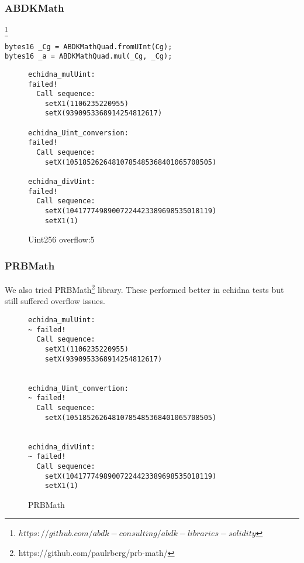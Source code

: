 \documentclass[runningheads]{llncs}
\begin{document}
\subsubsection{ABDKMath}
\footnote{$https://github.com/abdk-consulting/abdk-libraries-solidity$} 
\begin{verbatim}
bytes16 _Cg = ABDKMathQuad.fromUInt(Cg);
bytes16 _a = ABDKMathQuad.mul(_Cg, _Cg);
\end{verbatim}



\label{Uint256 overflow:5}
\begin{figure}
    \centering
    \caption{Uint256 overflow:5}
    \label{fig:Echidna Uint56 Overflow Tests}
\begin{lstlisting}[style=Bash]
echidna_mulUint:  
failed!
  Call sequence:
    setX1(1106235220955)
    setX(9390953368914254812617)

echidna_Uint_conversion: 
failed!
  Call sequence:
    setX(10518526264810785485368401065708505)

echidna_divUint:  
failed!
  Call sequence:
    setX(10417774989007224423389698535018119)
    setX1(1)
\end{lstlisting}
\end{figure}

\newpage 
\subsubsection{PRBMath}

We also tried PRBMath\footnote{https://github.com/paulrberg/prb-math/} library. These performed better in echidna tests but still suffered overflow issues.

\begin{figure}
    \centering
    \caption{PRBMath}
    \label{fig:Echidna PRBMath Tests}
\begin{lstlisting}[style=Bash]
echidna_mulUint:  
~ failed!
  Call sequence:
    setX1(1106235220955)
    setX(9390953368914254812617)


echidna_Uint_convertion:  
~ failed!
  Call sequence:
    setX(10518526264810785485368401065708505)


echidna_divUint:  
~ failed!
  Call sequence:
    setX(10417774989007224423389698535018119)
    setX1(1)
\end{lstlisting}
\end{figure}
\end{document}
